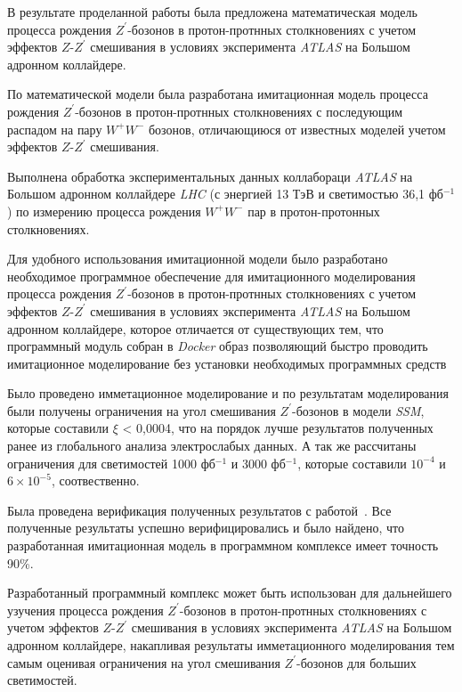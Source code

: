 В результате проделанной работы была предложена математическая
модель процесса
рождения ${Z}^{\prime}$-бозонов в протон-протнных столкновениях с учетом эффектов $Z$-${Z}^{\prime}$ смешивания в условиях эксперимента \textit{ATLAS} на Большом адронном коллайдере.

По математической модели была разработана имитационная модель процесса рождения ${Z}^{\prime}$-бозонов в протон-протнных столкновениях с последующим распадом на пару ${W}^{+}{W}^{-}$ бозонов, отличающиюся от известных моделей учетом эффектов $Z$-${Z}^{\prime}$ смешивания.

Выполнена обработка экспериментальных данных коллабораци  \textit{ATLAS} на Большом адронном коллайдере \textit{LHC} (с энергией 13 ТэВ и светимостью 36,1 фб${}^{−1}$) по измерению процесса рождения ${W}^{+}$${W}^{-}$ пар в протон-протонных столкновениях.

Для удобного использования имитационной модели было разработано необходимое программное обеспечение для имитационного моделирования процесса
рождения ${Z}^{\prime}$-бозонов в протон-протнных столкновениях с учетом эффектов $Z$-${Z}^{\prime}$ смешивания в условиях эксперимента \textit{ATLAS} на Большом адронном коллайдере, которое отличается от существующих тем, что программный модуль собран в \textit{Docker} образ позволяющий быстро проводить имитационное моделирование без установки необходимых программных средств

Было проведено имметационное моделирование и по результатам моделирования были получены ограничения на угол смешивания ${Z}^{\prime}$-бозонов в модели \textit{SSM}, которые составили $\xi$ < 0,0004, что на порядок лучше результатов полученных ранее из глобального анализа электрослабых данных. А так же рассчитаны ограничения для светимостей 1000 фб${}^{−1}$ и 3000 фб${}^{−1}$, которые составили ${10}^{-4}$ и $6\times{10}^{-5}$, соотвественно.

Была проведена верификация полученных результатов с
работой~\cite{2part-pankov}. Все полученные результаты успешно верифицировались и было найдено, что разработанная имитационная модель в программном комплексе имеет точность 90\%.

Разработанный программный комплекс может быть использован для дальнейшего узучения процесса рождения ${Z}^{\prime}$-бозонов в протон-протнных столкновениях с учетом эффектов $Z$-${Z}^{\prime}$ смешивания в условиях эксперимента \textit{ATLAS} на Большом адронном коллайдере, накапливая результаты имметационного моделирования тем самым оценивая ограничения на угол смешивания ${Z}^{\prime}$-бозонов для больших светимостей. 
